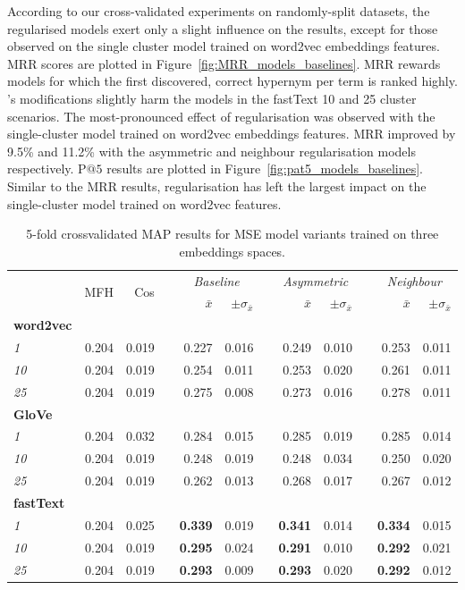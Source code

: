 According to our cross-validated experiments on randomly-split datasets, the regularised models exert only a slight influence on the results, except for those observed on the single cluster model trained on word2vec embeddings features.  MRR scores are plotted in Figure~\ref{fig:MRR_models_baselines}.  MRR rewards models for which the first discovered, correct hypernym per term is ranked highly.  \citeauthor{ustalov2017negative}'s modifications slightly harm the models in the fastText 10 and 25 cluster scenarios.  The most-pronounced effect of regularisation was observed with the single-cluster model trained on word2vec embeddings features.  MRR improved by 9.5\% and 11.2\%  with the asymmetric and neighbour regularisation models respectively.  P$@5$ results are plotted in Figure~\ref{fig:pat5_models_baselines}.  Similar to the MRR results, regularisation has left the largest impact on the single-cluster model trained on word2vec features.
\begin{table}\centering
\begin{tabular}{@{}lrrcrrcrrcrr@{}}\toprule
& \multirow{2}{*}{MFH} & \multirow{2}{*}{Cos} & \phantom{a} &  \multicolumn{2}{c}{\textit{Baseline}} & \phantom{a} & \multicolumn{2}{c}{\textit{Asymmetric}} & \phantom{a} & \multicolumn{2}{c}{\textit{Neighbour}}\\
\cmidrule{5-6} \cmidrule{8-9} \cmidrule{11-12}
&  &  && $\bar{x}$ & $\pm\sigma_{\bar{x}}$ && $\bar{x}$ & $\pm\sigma_{\bar{x}}$ && $\bar{x}$ & $\pm\sigma_{\bar{x}}$ \\ \midrule
\textbf{word2vec}\\
\textit{1} & 0.204 & 0.019 && 0.227 & 0.016 && 0.249 & 0.010 && 0.253 & 0.011 \\
\textit{10} & 0.204 & 0.019 && 0.254 & 0.011 && 0.253 & 0.020 && 0.261 & 0.011 \\
\textit{25} & 0.204 & 0.019 && 0.275 & 0.008 && 0.273 & 0.016 && 0.278 & 0.011 \\
\cmidrule{2-12}
\textbf{GloVe}\\
\textit{1} & 0.204 & 0.032 && 0.284 & 0.015 && 0.285 & 0.019 && 0.285 & 0.014 \\
\textit{10} & 0.204 & 0.019 && 0.248 & 0.019 && 0.248 & 0.034 && 0.250 & 0.020 \\
\textit{25} & 0.204 & 0.019 && 0.262 & 0.013 && 0.268 & 0.017 && 0.267 & 0.012 \\
\cmidrule{2-12}
\textbf{fastText}\\
\textit{1} & 0.204 & 0.025 && \textbf{0.339} & 0.019 && \textbf{0.341} & 0.014 && \textbf{0.334} & 0.015 \\
\textit{10} & 0.204 & 0.019 && \textbf{0.295} & 0.024 && \textbf{0.291} & 0.010 && \textbf{0.292} & 0.021 \\
\textit{25} & 0.204 & 0.019 && \textbf{0.293} & 0.009 && \textbf{0.293} & 0.020 && \textbf{0.292} & 0.012 \\
\bottomrule
\end{tabular}
\caption{5-fold crossvalidated \ac{MAP} results for \ac{MSE} model variants trained on three embeddings spaces.}\label{tab:map_mse}
\end{table}
